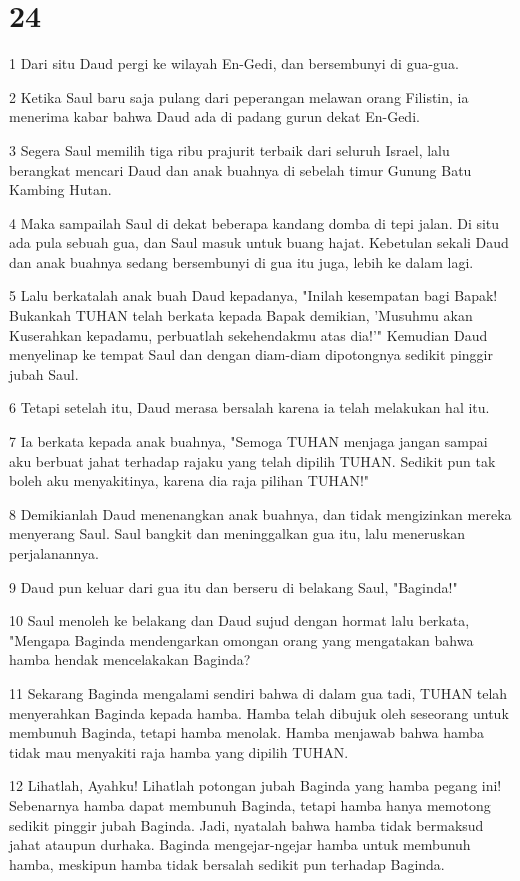 \chapter{24}

\par 1 Dari situ Daud pergi ke wilayah En-Gedi, dan bersembunyi di gua-gua.
\par 2 Ketika Saul baru saja pulang dari peperangan melawan orang Filistin, ia menerima kabar bahwa Daud ada di padang gurun dekat En-Gedi.
\par 3 Segera Saul memilih tiga ribu prajurit terbaik dari seluruh Israel, lalu berangkat mencari Daud dan anak buahnya di sebelah timur Gunung Batu Kambing Hutan.
\par 4 Maka sampailah Saul di dekat beberapa kandang domba di tepi jalan. Di situ ada pula sebuah gua, dan Saul masuk untuk buang hajat. Kebetulan sekali Daud dan anak buahnya sedang bersembunyi di gua itu juga, lebih ke dalam lagi.
\par 5 Lalu berkatalah anak buah Daud kepadanya, "Inilah kesempatan bagi Bapak! Bukankah TUHAN telah berkata kepada Bapak demikian, 'Musuhmu akan Kuserahkan kepadamu, perbuatlah sekehendakmu atas dia!'" Kemudian Daud menyelinap ke tempat Saul dan dengan diam-diam dipotongnya sedikit pinggir jubah Saul.
\par 6 Tetapi setelah itu, Daud merasa bersalah karena ia telah melakukan hal itu.
\par 7 Ia berkata kepada anak buahnya, "Semoga TUHAN menjaga jangan sampai aku berbuat jahat terhadap rajaku yang telah dipilih TUHAN. Sedikit pun tak boleh aku menyakitinya, karena dia raja pilihan TUHAN!"
\par 8 Demikianlah Daud menenangkan anak buahnya, dan tidak mengizinkan mereka menyerang Saul. Saul bangkit dan meninggalkan gua itu, lalu meneruskan perjalanannya.
\par 9 Daud pun keluar dari gua itu dan berseru di belakang Saul, "Baginda!"
\par 10 Saul menoleh ke belakang dan Daud sujud dengan hormat lalu berkata, "Mengapa Baginda mendengarkan omongan orang yang mengatakan bahwa hamba hendak mencelakakan Baginda?
\par 11 Sekarang Baginda mengalami sendiri bahwa di dalam gua tadi, TUHAN telah menyerahkan Baginda kepada hamba. Hamba telah dibujuk oleh seseorang untuk membunuh Baginda, tetapi hamba menolak. Hamba menjawab bahwa hamba tidak mau menyakiti raja hamba yang dipilih TUHAN.
\par 12 Lihatlah, Ayahku! Lihatlah potongan jubah Baginda yang hamba pegang ini! Sebenarnya hamba dapat membunuh Baginda, tetapi hamba hanya memotong sedikit pinggir jubah Baginda. Jadi, nyatalah bahwa hamba tidak bermaksud jahat ataupun durhaka. Baginda mengejar-ngejar hamba untuk membunuh hamba, meskipun hamba tidak bersalah sedikit pun terhadap Baginda.
